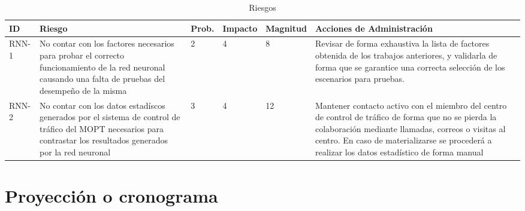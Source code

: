 	\begin{table}[!h]
			\centering
			\begin{tabular}{|p{1cm}|p{3cm}|p{2cm}|p{2cm}|p{2cm}|p{3cm}|}
				\hline
				\textbf{ID} & \textbf{Riesgo} & \textbf{Prob.} & \textbf{Impacto} & \textbf{Magnitud} & \textbf{Acciones de
				Administraci\'{o}n}\\ \hline 
				RNN-1 & No contar con los factores necesarios para probar el correcto
				funcionamiento de la red neuronal causando una falta de pruebas del
				desempe\~{n}o de la misma & 2 & 4 & 8 & Revisar de forma exhaustiva la lista
				de factores obtenida de los trabajos anteriores, y validarla de forma que se
				garantice una correcta selecci\'{o}n de los escenarios para pruebas.
				\\
				\hline
				RNN-2 & No contar con los datos estad\'{i}scos generados por el sistema de
				control de tr\'{a}fico del MOPT necesarios para contrastar los resultados
				generados por la red neuronal & 3 & 4 & 12 & Mantener contacto activo con
				el miembro del centro de control de tr\'{a}fico de forma que no se pierda
				la colaboraci\'{o}n mediante llamadas, correos o visitas al centro. En caso
				de materializarse se proceder\'{a} a realizar los datos estad\'{i}stico de
				forma manual\\ 
				\hline 				
				 
			\end{tabular}
			\caption{Riesgos}
			\label{tab:risk}
		\end{table}
		
	\section{Proyecci\'{o}n o cronograma}	